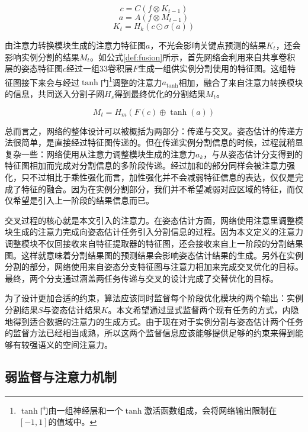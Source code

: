 \begin{equation}
\label{def:sharedconv}
c = C(f\otimes{K_{t-1}})
\end{equation}
\begin{equation}
\label{def:attenconverter}
a = A(f\otimes{M_{t-1}})
\end{equation}
\begin{equation}
\label{def:keypointhead}
K_t = H_k(c\odot \sigma(a))
\end{equation}

由注意力转换模块生成的注意力特征图$a$，不光会影响关键点预测的结果$K_t$，还会影响实例分割的结果$M_t$。如公式\eqref{def:fusion}所示，首先网络会利用来自共享卷积层的姿态特征图$c$经过一组3\times3卷积层$F$生成一组供实例分割使用的特征图。这组特征图接下来会与经过$\tanh$门\footnote{$\tanh$门由一组神经层和一个$\tanh$激活函数组成，会将网络输出限制在$[-1, 1]$的值域中。}调整的注意力$a_{\tanh}$相加，融合了来自注意力转换模块的信息，共同送入分割子网$H_s$得到最终优化的分割结果$M_t$。

\begin{equation}
\label{def:fusion}
M_t = H_m(F(c) \oplus \tanh(a))
\end{equation}

总而言之，网络的整体设计可以被概括为两部分：传递与交叉。姿态估计的传递方法很简单，是直接经过特征图传递的。但在传递实例分割信息的时候，过程就稍显复杂一些：网络使用从注意力调整模块生成的注意力$a_k$，与从姿态估计分支得到的特征图相加而完成对分割信息的多阶段传递。经过加和的部分同样会被注意力强化，只不过相比于乘性强化而言，加性强化并不会减弱特征信息的表达，仅仅是完成了特征的融合。因为在实例分割部分，我们并不希望减弱对应区域的特征，而仅仅希望是引入上一阶段的结果信息而已。

交叉过程的核心就是本文引入的注意力。在姿态估计方面，网络使用注意里调整模块生成的注意力完成向姿态估计任务引入分割信息的过程。因为本文定义的注意力调整模块不仅回接收来自特征提取器的特征图，还会接收来自上一阶段的分割结果图。这样就意味着分割结果图的预测结果会影响姿态估计结果的生成。另外在实例分割的部分，网络使用来自姿态分支特征图与注意力相加来完成交叉优化的目标。最终，两个分支通过涵盖两任务传递与交叉的设计完成了交替优化的目标。

为了设计更加合适的约束，算法应该同时监督每个阶段优化模块的两个输出：实例分割结果$S$与姿态估计结果$K$。本文希望通过显式监督两个现有任务的方式，内隐地得到适合数据的注意力的生成方式。由于现在对于实例分割与姿态估计两个任务的监督方法已经相当成熟，所以这两个监督信息应该能够提供足够的约束来得到能够有较强语义的空间注意力。

\subsection{弱监督与注意力机制}
\label{subsec:weaksuper_attention}

